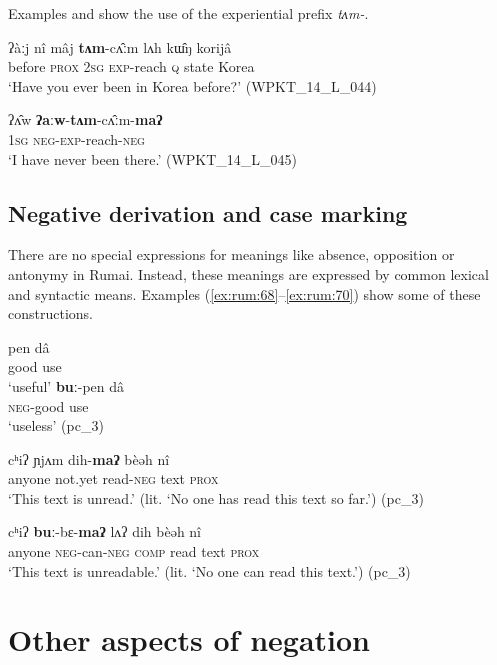 \documentclass[output=paper,colorlinks,citecolor=brown]{langscibook}
\begin{document}
Examples  and  show the use of the experiential prefix \textit{tʌm-}.

\ea\label{ex:rum:66}
    \gll ʔàːj	nî	mâj	\textbf{tʌm}-cʌ̂ːm	lʌh	kɯ̂ŋ	korijâ \\
         before \textsc{prox} 2\textsc{sg} \textsc{exp}{}-reach \textsc{q} state Korea \\
    \glt ‘Have you ever been in Korea before?’ (WPKT\_14\_L\_044)
\z 

\ea\label{ex:rum:67}
    \gll ʔʌ̂w	\textbf{ʔaːw}-\textbf{tʌm}-cʌ̂ːm-\textbf{maʔ} \\
         1\textsc{sg} \textsc{neg}{}-\textsc{exp}{}-reach-\textsc{neg} \\
    \glt ‘I have never been there.’ (WPKT\_14\_L\_045)
\z 

\subsection{Negative derivation and case marking} \label{sec:rum:3.3}

There are no special expressions for meanings like absence, opposition or antonymy in Rumai. Instead, these meanings are expressed by common lexical and syntactic means. Examples (\ref{ex:rum:68}--\ref{ex:rum:70}) show some of these constructions.

\ea\label{ex:rum:68}
    \ea\label{ex:rum:68a}
        \gll pen	dâ \\ 
             good use \\
        \glt  ‘useful’ 
    \ex\label{ex:rum:68b}
        \gll \textbf{buː}-pen	dâ \\
             \textsc{neg}{}-good use \\
        \glt ‘useless’ (pc\_3)
    \z
\z 

\ea\label{ex:rum:69}
    \gll cʰiʔ	ɲjʌm	dih-\textbf{maʔ}	bèəh	nî \\
         anyone not.yet read-\textsc{neg} text \textsc{prox} \\
    \glt ‘This text is unread.’ (lit. ‘No one has read this text so far.’) (pc\_3)
\z 

\ea\label{ex:rum:70}
    \gll cʰiʔ	\textbf{buː}-bɛ-\textbf{maʔ}	lʌʔ	dih	bèəh	nî \\
         anyone \textsc{neg}{}-can-\textsc{neg} \textsc{comp} read text \textsc{prox} \\
    \glt ‘This text is unreadable.’ (lit. ‘No one can read this text.’) (pc\_3)
\z 

\section{Other aspects of negation} \label{sec:rum:4}
\end{document}

